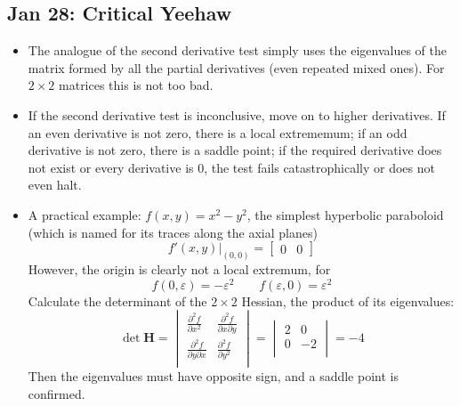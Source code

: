 \documentclass[10pt, oneside]{article}
\newcommand{\del}{\partial}
\let\ep\varepsilon
\newcommand{\mat}[1]{\mathbf{#1}}
\begin{document}
\subsection{Jan 28: Critical Yeehaw}
\begin{itemize}
    \item The analogue of the second derivative test simply uses the eigenvalues of the matrix formed by all the partial derivatives (even repeated mixed ones). For $2\times2$ matrices this is not too bad.
    \item If the second derivative test is inconclusive, move on to higher derivatives. If an even derivative is not zero, there is a local extrememum; if an odd derivative is not zero, there is a saddle point; if the required derivative does not exist or every derivative is 0, the test fails catastrophically or does not even halt.
    \item A practical example: $f(x,y) = x^2 - y^2$, the simplest hyperbolic paraboloid (which is named for its traces along the axial planes)
        \[f'(x,y)|_{(0,0)} = \begin{bmatrix}0&0\end{bmatrix}\]
        However, the origin is clearly not a local extremum, for
        \[f(0,\ep) = -\ep^2 \quad \quad f(\ep,0) = \ep^2\]
        Calculate the determinant of the $2\times2$ Hessian, the product of its eigenvalues:
        \[\det \mat{H} = \begin{vmatrix}
            \frac{\del^2 f}{\del x^2} & \frac{\del^2 f}{\del x \del y}\\
            \frac{\del^2 f}{\del y \del x} & \frac{\del^2 f}{\del y^2}\\
        \end{vmatrix}
        = \begin{vmatrix}
            2 & 0\\
            0 & -2\\
        \end{vmatrix}
        = -4\]
        Then the eigenvalues must have opposite sign, and a saddle point is confirmed.
\end{itemize}
\end{document}
